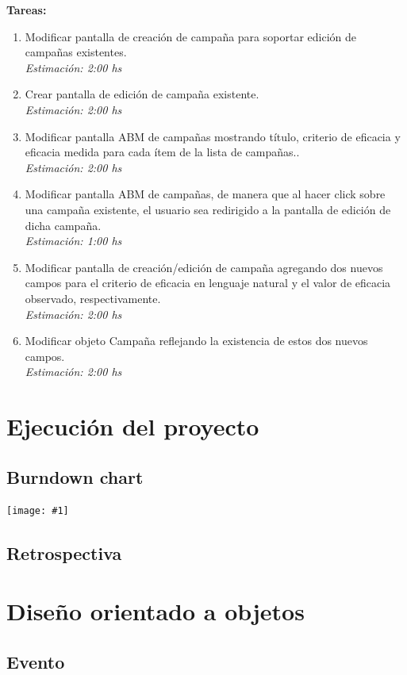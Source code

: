 \documentclass[a4paper, 10pt, twoside]{article}
\newcommand{\grafico}[1]{
  \begin{center}
    \texttt{[image: \#1]}
  \end{center}
}
\newenvironment{tasks}{
  \textbf{Tareas:}
  \begin{enumerate}
}{
  \end{enumerate}
}
\newcommand{\task}[2] {
  \item #1.\\
  \emph{Estimación: #2 hs}
}
\begin{document}
\begin{tasks}
  \task{Modificar pantalla de creación de campaña para soportar edición de campañas existentes}{2:00}
  \task{Crear pantalla de edición de campaña existente}{2:00}
  \task{Modificar pantalla ABM de campañas mostrando título, criterio de eficacia y eficacia medida para cada ítem de la lista de campañas.}{2:00}
  \task{Modificar pantalla ABM de campañas, de manera que al hacer click sobre una campaña existente, el usuario sea redirigido a la pantalla de edición de dicha campaña}{1:00}
  \task{Modificar pantalla de creación/edición de campaña agregando dos nuevos campos para el criterio de eficacia en lenguaje natural y el valor de eficacia observado, respectivamente}{2:00}
  \task{Modificar objeto Campaña reflejando la existencia de estos dos nuevos campos}{2:00}
\end{tasks}

\newpage
\section{Ejecución del proyecto}

\subsection{Burndown chart}
\grafico{diagramas/iteration_burndown.jpg}

\subsection{Retrospectiva}






\newpage
\section{Diseño orientado a objetos}


\subsection{Evento}
\end{document}
